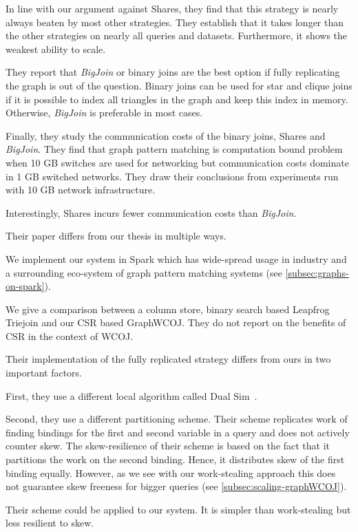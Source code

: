 In line with our argument against Shares, they find that this strategy is nearly always
beaten by most other strategies.
They establish that it takes longer than the other strategies on nearly all queries and datasets.
Furthermore, it shows the weakest ability to scale.

They report that \textit{BigJoin} or binary joins are the best option if fully
replicating the graph is out of the question.
Binary joins can be used for star and clique joins if it is possible to index all triangles in
the graph and keep this index in memory.
Otherwise, \textit{BigJoin} is preferable in most cases.

Finally, they study the communication costs of the binary joins, Shares and \textit{BigJoin}.
They find that graph pattern matching is computation bound problem when 10 GB switches are used
for networking but communication costs dominate in 1 GB switched networks.
They draw their conclusions from experiments run with 10 GB network infrastructure.

Interestingly, Shares incurs fewer communication costs than \textit{BigJoin}.

Their paper differs from our thesis in multiple ways.

We implement our system in Spark which has wide-spread usage in industry and a surrounding eco-system
of graph pattern matching systems (see \cref{subsec:graphs-on-spark}).

We give a comparison between a column store, binary search based Leapfrog Triejoin and
our \textsc{CSR} based GraphWCOJ.
They do not report on the benefits of \textsc{CSR} in the context of \textsc{WCOJ}.

Their implementation of the fully replicated strategy differs from ours in two important factors.

First, they use a different local algorithm called Dual Sim~\cite{dualsim}.

Second, they use a different partitioning scheme.
Their scheme replicates work of finding bindings for the first and second variable in a query and does not actively counter skew.
The skew-resilience of their scheme is based on the fact that it partitions the work on the second
binding.
Hence, it distributes skew of the first binding equally.
However, as we see with our work-stealing approach this does not guarantee skew freeness for
bigger queries (see \cref{subsec:scaling-graphWCOJ}).

Their scheme could be applied to our system.
It is simpler than work-stealing but less resilient to skew.

